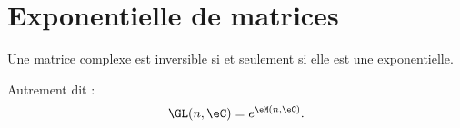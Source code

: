 \section{Exponentielle de matrices}

\begin{proposition} \label{PropKKdmnkD}
    Une matrice complexe est inversible si et seulement si elle est une exponentielle.

    Autrement dit :
    \begin{equation}
        \GL(n,\eC)= e^{\eM(n,\eC)}.
    \end{equation}
\end{proposition}

